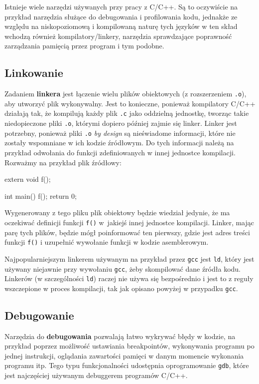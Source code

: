 Istnieje wiele narzędzi używanych przy pracy z C/C++. Są to oczywiście na przykład narzędzia służące do debugowania i profilowania kodu, jednakże ze względu na niskopoziomową i kompilowaną naturę tych języków w ten skład wchodzą również kompilatory/linkery, narzędzia sprawdzające poprawność zarządzania pamięcią przez program i tym podobne.

\subsection{Linkowanie}

Zadaniem \textbf{linkera} jest łączenie wielu plików obiektowych (z rozszerzeniem \texttt{.o}), aby utworzyć plik wykonywalny. Jest to konieczne, ponieważ kompilatory C/C++ działają tak, że kompilują każdy plik \texttt{.c} jako oddzielną jednostkę, tworząc takie niedopieczone pliki \texttt{.o}, którymi dopiero później zajmie się linker. Linker jest potrzebny, ponieważ pliki \texttt{.o} \textit{by design} są nieświadome informacji, które nie zostały wspomniane w ich kodzie źródłowym. Do tych informacji należą na przykład odwołania do funkcji zdefiniowanych w innej jednostce kompilacji. Rozważmy na przykład plik źródłowy:
\begin{cpp}
extern void f();

int main() {
    f();
    return 0;
}
\end{cpp}
Wygenerowany z tego pliku plik obiektowy będzie wiedział jedynie, że ma oczekiwać definicji funkcji \texttt{f()} w~jakiejś innej jednostce kompilacji. Linker, mając parę tych plików, będzie mógł poinformować ten pierwszy, gdzie jest adres treści funkcji \texttt{f()} i uzupełnić wywołanie funkcji w kodzie asemblerowym.

Najpopularniejszym linkerem używanym na przykład przez \texttt{gcc} jest \texttt{ld}, który jest używany niejawnie przy wywołaniu \texttt{gcc}, żeby skompilować dane źródła kodu. Linkerów (w szczególności \texttt{ld}) raczej nie używa się bezpośrednio i jest to z reguły wszczepione w proces kompilacji, tak jak opisano powyżej w przypadku \texttt{gcc}.

\subsection{Debugowanie}

Narzędzia do \textbf{debugowania} pozwalają łatwo wykrywać błędy w kodzie, na przykład poprzez możliwość ustawiania breakpointów, wykonywania programu po jednej instrukcji, oglądania zawartości pamięci w danym momencie wykonania programu itp. Tego typu funkcjonalności udostępnia oprogramowanie \texttt{gdb}, które jest najczęściej używanym debuggerem programów C/C++. 

